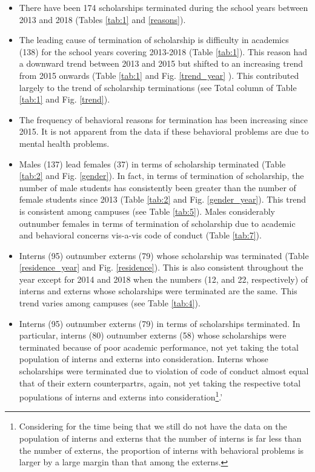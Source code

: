 \documentclass[a4paper]{article}
\providecommand{\tightlist}{%
  \setlength{\itemsep}{0pt}\setlength{\parskip}{0pt}}
\let\rmarkdownfootnote\footnote%
\def\footnote{\protect\rmarkdownfootnote}
\begin{document}
\begin{itemize}
\tightlist
\item
  There have been 174 scholarships terminated during the school years
  between 2013 and 2018 (Tables \ref{tab:1} and \ref{reasons}).
\item
  The leading cause of termination of scholarship is difficulty in
  academics (138) for the school years covering 2013-2018 (Table
  \ref{tab:1}). This reason had a downward trend between 2013 and 2015
  but shifted to an increasing trend from 2015 onwards (Table
  \ref{tab:1} and Fig. \ref{trend_year} ). This contributed largely to
  the trend of scholarship terminations (see Total column of Table
  \ref{tab:1} and Fig. \ref{trend}).
\item
  The frequency of behavioral reasons for termination has been
  increasing since 2015. It is not apparent from the data if these
  behavioral problems are due to mental health problems.
\item
  Males (137) lead females (37) in terms of scholarship terminated
  (Table \ref{tab:2} and Fig. \ref{gender}). In fact, in terms of
  termination of scholarship, the number of male students has
  consistently been greater than the number of female students since
  2013 (Table \ref{tab:2} and Fig. \ref{gender_year}). This trend is
  consistent among campuses (see Table \ref{tab:5}). Males considerably
  outnumber females in terms of termination of scholarship due to
  academic and behavioral concerns vis-a-vis code of conduct (Table
  \ref{tab:7}).
\item
  Interns (95) outnumber externs (79) whose scholarship was terminated
  (Table \ref{residence_year} and Fig. \ref{residence}). This is also
  consistent throughout the year except for 2014 and 2018 when the
  numbers (12, and 22, respectively) of interns and externs whose
  scholarships were terminated are the same. This trend varies among
  campuses (see Table \ref{tab:4}).
\item
  Interns (95) outnumber externs (79) in terms of scholarships
  terminated. In particular, interns (80) outnumber externs (58) whose
  scholarships were terminated because of poor academic performance, not
  yet taking the total population of interns and externs into
  consideration. Interns whose scholarships were terminated due to
  violation of code of conduct almost equal that of their extern
  counterpartrs, again, not yet taking the respective total populations
  of interns and externs into consideration\footnote{Considering for the
    time being that we still do not have the data on the population of
    interns and externs that the number of interns is far less than the
    number of externs, the proportion of interns with behavioral
    problems is larger by a large margin than that among the externs.}.'
\end{itemize}
\end{document}
